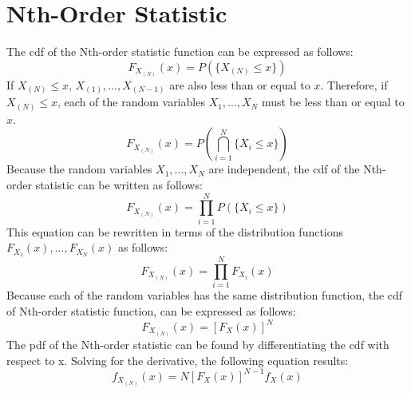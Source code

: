 \documentclass[conference]{IEEEtran}
\begin{document}
\section{Nth-Order Statistic}
\label{Nth-Order Statistic Section}


The cdf of the Nth-order statistic function can be expressed as follows:
\begin{equation}
F_{X_{(N)}}(x) = P(\{X_{(N)} \leq x\})
\end{equation}
If $X_{(N)} \leq x$, $X_{(1)},...,X_{(N-1)}$ are also less than or equal to $x$. Therefore, if  $X_{(N)} \leq x$, each of the random variables $X_1,...,X_N$ must be less than or equal to $x$.
\begin{equation}
F_{X_{(N)}}(x) = P\left(\bigcap_{i=1}^N\{X_i \leq x\}\right)
\end{equation}
Because the random variables $X_1,...,X_N$ are independent, the cdf of the Nth-order statistic can be written as follows:
\begin{equation}
F_{X_{(N)}}(x) = \prod_{i=1}^N P(\{X_i \leq x\})
\end{equation}
This equation can be rewritten in terms of the distribution functions $F_{X_1}(x),...,F_{X_N}(x)$ as follows:
\begin{equation}
F_{X_{(N)}}(x) = \prod_{i=1}^N F_{X_i}(x)
\end{equation}
Because each of the random variables has the same distribution function, the cdf of Nth-order statistic function, can be expressed as follows:
\begin{equation}
F_{X_{(N)}}(x) = [F_X(x)]^N
\end{equation}
The pdf of the Nth-order statistic can be found by differentiating the cdf with respect to x. Solving for the derivative, the following equation results:
\begin{equation}
f_{X_{(N)}}(x) = N[F_X(x)]^{N-1}f_X(x)
\end{equation}
\end{document}
